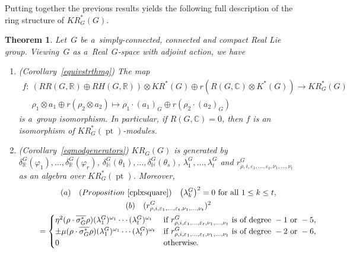 \documentclass[pdftex]{sigma}
\numberwithin{equation}{section}
\newtheorem{Theorem}{Theorem}[section]
\DeclareMathOperator{\pt}{pt}
\begin{document}
Putting together the previous results yields the following full description of the ring structure of $KR_G^*(G)$.
\begin{Theorem}
\label{mainthm2}
Let~$G$ be a~simply-connected, connected and compact Real Lie group.
Viewing~$G$ as a~Real~$G$-space with adjoint action, we have
\begin{enumerate}\itemsep=0pt
\item[$1.$] {\rm (}Corollary~{\rm \ref{equivstrthmg})} The map
\begin{gather*}
f: \ (RR(G, \mathbb{R})\oplus RH(G, \mathbb{R}))\otimes KR^*(G)\oplus r(R(G, \mathbb{C})\otimes K^*(G))\to KR_G^*(G)
\\
\phantom{f: {}} \
\rho_1\otimes a_1\oplus r(\rho_2\otimes a_2)\mapsto \rho_1\cdot (a_1)_{G}\oplus r(\rho_2\cdot (a_2)_G)
\end{gather*}
is a~group isomorphism.
In particular, if $R(G, \mathbb{C})=0$, then $f$ is an isomorphism of $KR^*_{G}(\pt)$-modules.
\item[$2.$] {\rm (}Corollary~{\rm \ref{eqmodgenerators})}
$KR_{G}(G)$ is generated by $\delta_\mathbb{R}^G(\varphi_1), {\dots}, \delta_\mathbb{R}^G(\varphi_r)$,
$\delta_\mathbb{H}^G(\theta_1), {\dots}, \delta_\mathbb{H}^G(\theta_s)$, $\lambda_1^G, {\dots}, \lambda_t^G\!$ and
$r^G_{\rho, i, \varepsilon_1, \dots, \varepsilon_t, \nu_1, \dots, \nu_t}$ as an algebra over $KR_{G}^*(\pt)$.
Moreover,
\begin{gather}
(a)\quad{\rm (}Proposition~{\rm \ref{cplxsquare})} \quad \big(\lambda_k^G\big)^2=0\text{ for all }1\leq k\leq t,\nonumber
\\ \label{cplxrel1}
(b)\quad
(r^G_{\rho, i, \varepsilon_1, \dots, \varepsilon_t, \nu_1, \dots, \nu_t})^2
\\
\phantom{(b)\quad}
=
\begin{cases}
\eta^2(\rho\cdot\overline{\sigma_G^*}
\rho)(\lambda^G_1)^{\omega_1}\cdots(\lambda_t^G)^{\omega_t}
&
\text{if }r^G_{\rho, i, \varepsilon_1, \dots, \varepsilon_t, \nu_1, \dots, \nu_t}
\text{ is of degree} \ -1\text{ or }-5,
\\
\pm\mu(\rho\cdot\overline{\sigma_G^*}
\rho)(\lambda^G_1)^{\omega_1}\cdots(\lambda_t^G)^{\omega_t}
&
\text{if }r^G_{\rho, i, \varepsilon_1, \dots, \varepsilon_t, \nu_1, \dots, \nu_t}
\text{ is of degree} \ -2\text{ or }-6,
\\
0
&\text{otherwise}.
\end{cases}
\nonumber
\end{gather}

\end{enumerate}
\end{Theorem}
\end{document}
